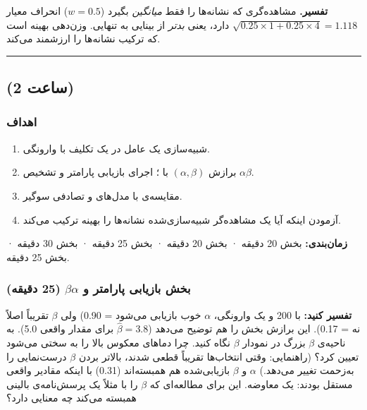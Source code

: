 \textbf{تفسیر.} مشاهده‌گری که نشانه‌ها را فقط \emph{میانگین} بگیرد
(\(w = 0.5\)) انحراف معیار
\(\sqrt{0.25 \times 1 + 0.25 \times 4} = 1.118\)  دارد، یعنی
\emph{بدتر} از بینایی به تنهایی. وزن‌دهی بهینه است که ترکیب نشانه‌ها را
ارزشمند می‌کند.

\begin{center}\rule{0.5\linewidth}{0.5pt}\end{center}


\subsection{\texorpdfstring{ (2 ساعت)}{lab (2 ساعت)}}

\subsubsection{اهداف}

\begin{enumerate}
\def\labelenumi{\arabic{enumi}.}
\tightlist
\item
  شبیه‌سازی یک عامل  در یک تکلیف  با وارونگی.
\item
  برازش \((\alpha, \beta)\) با ؛ اجرای بازیابی پارامتر و تشخیص
   \(\alpha\)\lr{--}\(\beta\).
\item
  مقایسه‌ی  با مدل‌های  و تصادفی
  سوگیر.
\item
  آزمودن اینکه آیا یک مشاهده‌گر شبیه‌سازی‌شده نشانه‌ها را بهینه ترکیب می‌کند.
\end{enumerate}

\textbf{زمان‌بندی:} بخش  20 دقیقه · بخش  20 دقیقه · بخش
 25 دقیقه · بخش  30 دقیقه · بخش  25 دقیقه.

\subsubsection{\texorpdfstring{بخش  بازیابی پارامتر و
 \ensuremath{\alpha}\lr{--}\ensuremath{\beta} (25
دقیقه)}{بخش C: بازیابی پارامتر و trade-off \ensuremath{\alpha}\lr{--}\ensuremath{\beta} (25 دقیقه)}}

\textbf{تفسیر کنید:} با 200  و یک وارونگی، \(\alpha\) خوب
بازیابی می‌شود  = 0.90) ولی \(\beta\) تقریباً اصلاً نه  =
0.17). این برازش بخش  را هم توضیح می‌دهد (\(\hat\beta = 3.8\) برای
مقدار واقعی 5.0). به ناحیه‌ی \(\beta\) بزرگ در نمودار \(\beta\) نگاه
کنید. چرا دماهای معکوس بالا را به سختی می‌شود تعیین کرد؟ (راهنمایی: وقتی
انتخاب‌ها تقریباً قطعی شدند، بالاتر بردن \(\beta\) درست‌نمایی را به‌زحمت
تغییر می‌دهد.) \(\alpha\) و \(\beta\) بازیابی‌شده هم همبسته‌اند (0.31) با
اینکه مقادیر واقعی مستقل بودند: یک معاوضه. این برای مطالعه‌ای که
\(\beta\) را با مثلاً یک پرسش‌نامه‌ی بالینی همبسته می‌کند چه معنایی دارد؟


